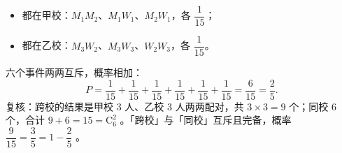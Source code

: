 \begin{answer}
\begin{itemize}
\item 都在甲校：$M_1M_2$、$M_1W_1$、$M_2W_1$，各 $\dfrac1{15}$；
\item 都在乙校：$M_3W_2$、$M_3W_3$、$W_2W_3$，各 $\dfrac1{15}$。
\end{itemize}

六个事件两两互斥，概率相加：
\nopagebreak[4]
\[
P=\frac1{15}+\frac1{15}+\frac1{15}+\frac1{15}+\frac1{15}+\frac1{15}=\frac6{15}=\frac25.
\]
复核：跨校的结果是甲校 $3$ 人、乙校 $3$ 人两两配对，共 $3\times3=9$ 个；同校 $6$ 个，合计 $9+6=15=\mathrm C_6^2$ 。「跨校」与「同校」互斥且完备，概率 $\dfrac9{15}=\dfrac35=1-\dfrac25$ 。



\end{answer}
